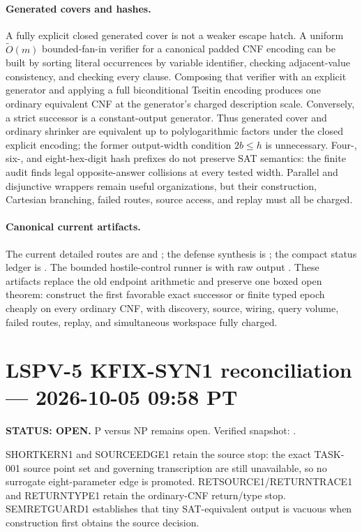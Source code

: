 \documentclass[11pt]{article}
\begin{document}
\paragraph{Generated covers and hashes.}
A fully explicit closed generated cover is not a weaker escape hatch.  A
uniform $\widetilde O(m)$ bounded-fan-in verifier for a canonical padded CNF
encoding can be built by sorting literal occurrences by variable identifier,
checking adjacent-value consistency, and checking every clause.  Composing
that verifier with an explicit generator and applying a full biconditional
Tseitin encoding produces one ordinary equivalent CNF at the generator's
charged description scale.  Conversely, a strict successor is a
constant-output generator.  Thus generated cover and ordinary shrinker are
equivalent up to polylogarithmic factors under the closed explicit encoding;
the former output-width condition $2b\le h$ is unnecessary.  Four-, six-, and
eight-hex-digit hash prefixes do not preserve SAT semantics: the finite audit
finds legal opposite-answer collisions at every tested width.  Parallel and
disjunctive wrappers remain useful organizations, but their construction,
Cartesian branching, failed routes, source access, and replay must all be
charged.

\paragraph{Canonical current artifacts.}
The current detailed routes are  and ; the
defense synthesis is ; the compact status ledger is
.  The bounded hostile-control runner is
 with raw output
.  These artifacts replace the old
endpoint arithmetic and preserve one boxed open theorem: construct the first
favorable exact successor or finite typed epoch cheaply on every ordinary CNF,
with discovery, source, wiring, query volume, failed routes, replay, and
simultaneous workspace fully charged.

\clearpage

\section{LSPV-5 KFIX-SYN1 reconciliation --- 2026-10-05 09:58 PT}
\textbf{STATUS: OPEN.} P versus NP remains open. Verified snapshot:
.

SHORTKERN1 and SOURCEEDGE1 retain the source stop: the exact TASK-001 source point set and governing transcription are still unavailable, so no surrogate eight-parameter edge is promoted. RETSOURCE1/RETURNTRACE1 and RETURNTYPE1 retain the ordinary-CNF return/type stop. SEMRETGUARD1 establishes that tiny SAT-equivalent output is vacuous when construction first obtains the source decision.
\end{document}
